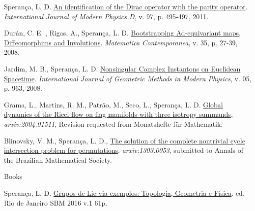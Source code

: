 \documentclass[10pt]{article}
\newenvironment{innerlist}[1][\enskip\textbullet]%
{\begin{compactitem}[#1]}{\end{compactitem}}
\begin{document}
\begin{enumerate}
\begin{innerlist}[-]
			
			
			\item Sperança, L. D. \href{https://www.worldscientific.com/doi/10.1142/S0218271814440039}{An identification of the Dirac operator with the parity operator}. { \textit{International Journal of Modern Physics D},  v. 97, p. 495-497, 2011}.
			
			
			
			
			
			\item Durán, C. E. , Rigas, A., Sperança, L. D.  \href{https://www.mat.unb.br/~matcont/35_2.pdf}{Bootstrapping Ad-equivariant maps, Diffeomorphims and Involutions}. {\textit{Matematica Contemporanea},  v. 35, p. 27-39, 2008}.
			
			\item Jardim, M. B., Sperança, L. D. \href{https://www.worldscientific.com/doi/10.1142/S0219887808003132}{Nonsingular Complex Instantons on Euclidean Spacetime}. {\textit{International Journal of Geometric Methods in Modern Physics}, v. 05, p. 963, 2008}.
			
			
			
			\item Grama, L., Martins, R. M., Patrão, M., Seco, L., Sperança, L. D.
			\href{https://arxiv.org/abs/2004.01511}{Global dynamics of the Ricci flow on flag manifolds with three isotropy summands}, \textit{{arxiv:2004.01511}}, Revision requested from  Monatshefte f\"ur Mathematik.
			
			
			
			
			
			\item Blinovsky, V. M., Sperança, L. D., \href{https://arxiv.org/abs/1303.0053}{The solution of the complete nontrivial cycle intersection problem for permutations}. 
			\textit{{arxiv:1303.0053}}, submitted to Annals of the Brazilian Mathematical Society.
			
			
		\end{innerlist}
		
		\item {Books}
		\begin{innerlist}[-]
			\item  Sperança, L. D. \href{https://sbm.org.br/wp-content/uploads/2021/10/grupos-de-lie-via-exemplos_ebook.pdf}{Grupos de Lie via exemplos: Topologia, Geometria e Física}. ed. Rio de Janeiro SBM 2016 v.1 61p.
			
			
		\end{innerlist}
		
		
	\end{enumerate}
	
\end{document}
